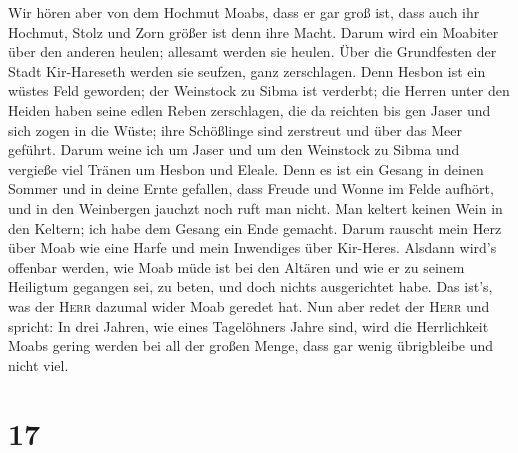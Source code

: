  Wir hören aber von dem Hochmut Moabs, dass er gar groß
ist, dass auch ihr Hochmut, Stolz und Zorn größer ist denn ihre Macht.
 Darum wird ein Moabiter über den anderen heulen; allesamt
werden sie heulen. Über die Grundfesten der Stadt Kir-Hareseth werden
sie seufzen, ganz zerschlagen.  Denn Hesbon ist ein wüstes
Feld geworden; der Weinstock zu Sibma ist verderbt; die Herren unter den
Heiden haben seine edlen Reben zerschlagen, die da reichten bis gen
Jaser und sich zogen in die Wüste; ihre Schößlinge sind zerstreut und
über das Meer geführt.  Darum weine ich um Jaser und um
den Weinstock zu Sibma und vergieße viel Tränen um Hesbon und Eleale.
Denn es ist ein Gesang in deinen Sommer und in deine Ernte gefallen,
 dass Freude und Wonne im Felde aufhört, und in den
Weinbergen jauchzt noch ruft man nicht. Man keltert keinen Wein in den
Keltern; ich habe dem Gesang ein Ende gemacht.  Darum
rauscht mein Herz über Moab wie eine Harfe und mein Inwendiges über
Kir-Heres.  Alsdann wird's offenbar werden, wie Moab müde
ist bei den Altären und wie er zu seinem Heiligtum gegangen sei, zu
beten, und doch nichts ausgerichtet habe.  Das ist's, was
der \textsc{Herr} dazumal wider Moab geredet hat.  Nun
aber redet der \textsc{Herr} und spricht: In drei Jahren, wie eines
Tagelöhners Jahre sind, wird die Herrlichkeit Moabs gering werden bei
all der großen Menge, dass gar wenig übrigbleibe und nicht viel.

\hypertarget{section-16}{%
\section{17}\label{section-16}}

